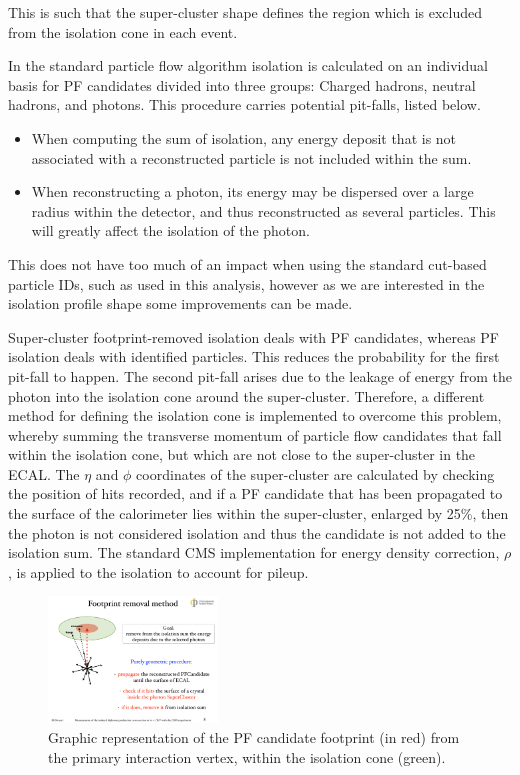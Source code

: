 This is such that the super-cluster shape defines the region which is excluded from the isolation cone in each event.

In the standard particle flow algorithm isolation is calculated on an individual basis for PF candidates divided into three groups: Charged hadrons, neutral hadrons, and photons. This procedure carries potential pit-falls, listed below.

\begin{itemize}
	\item When computing the sum of isolation, any energy deposit that is not associated with a reconstructed particle is not included within the sum.  
	\item When reconstructing a photon, its energy may be dispersed over a large radius within the detector, and thus reconstructed as several particles. This will greatly affect the isolation of the photon.
\end{itemize}

This does not have too much of an impact when using the standard cut-based particle IDs, such as used in this analysis, however as we are interested in the isolation profile shape some improvements can be made. 

Super-cluster footprint-removed isolation deals with PF candidates, whereas PF isolation deals with identified particles. This reduces the probability for the first pit-fall to happen. The second pit-fall arises due to the leakage of energy from the photon into the isolation cone around the super-cluster. Therefore, a different method for defining the isolation cone is implemented to overcome this problem, whereby summing the transverse momentum of particle flow candidates that fall within the isolation cone, but which are not close to the super-cluster in the ECAL. The $\eta$ and $\phi$ coordinates of the super-cluster are calculated by checking the position of hits recorded, and if a PF candidate that has been propagated to the surface of the calorimeter lies within the super-cluster, enlarged by 25\%, then the photon is not considered isolation and thus the candidate is not added to the isolation sum. The standard CMS implementation for energy density correction, $\rho$, is applied to the isolation to account for pileup. 

\begin{figure} 
\begin{center}
\includegraphics[width=0.4\textwidth]{Figures/RandomCone3.pdf}
\end{center}
\caption{Graphic representation of the PF candidate footprint (in red) from the primary interaction vertex, within the isolation cone (green). \cite{MarcoThesis}}
\label{fig-SCFR}
\end{figure}

